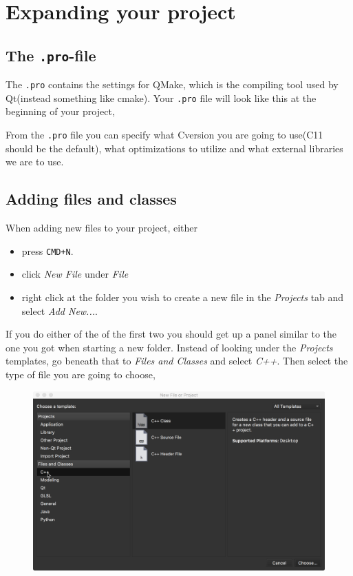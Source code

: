 \documentclass[11pt]{article}
\newcommand{\CC}{C\nolinebreak\hspace{-.05em}\raisebox{.4ex}{\tiny\bf +}\nolinebreak\hspace{-.10em}\raisebox{.4ex}{\tiny\bf +}}
\def\CC{{C\nolinebreak[4]\hspace{-.05em}\raisebox{.4ex}{\tiny\bf ++}}}
\begin{document}
\section{Expanding your project}
\subsection{The \texorpdfstring{\texttt{.pro}}{.pro}-file}
The \texttt{.pro} contains the settings for QMake, which is the compiling tool used by Qt(instead something like cmake). Your \texttt{.pro} file will look like this at the beginning of your project,

From the \texttt{.pro} file you can specify what \CC version you are going to use(\CC11 should be the default), what optimizations to utilize and what external libraries we are to use.

\subsection{Adding files and classes}
When adding new files to your project, either
\begin{itemize}
    \item press \texttt{CMD+N}.
    \item click \textit{New File} under \textit{File}
    \item right click at the folder you wish to create a new file in the \textit{Projects} tab and select \textit{Add New...}.
\end{itemize}
If you do either of the of the first two you should get up a panel similar to the one you got when starting a new folder. Instead of looking under the \textit{Projects} templates, go beneath that to \textit{Files and Classes} and select \textit{C++}. Then select the type of file you are going to choose,
\begin{figure}[H]
    \centering
    \includegraphics[width=\textwidth]{figures/new_files/select_file.png}
\end{figure}
\end{document}

